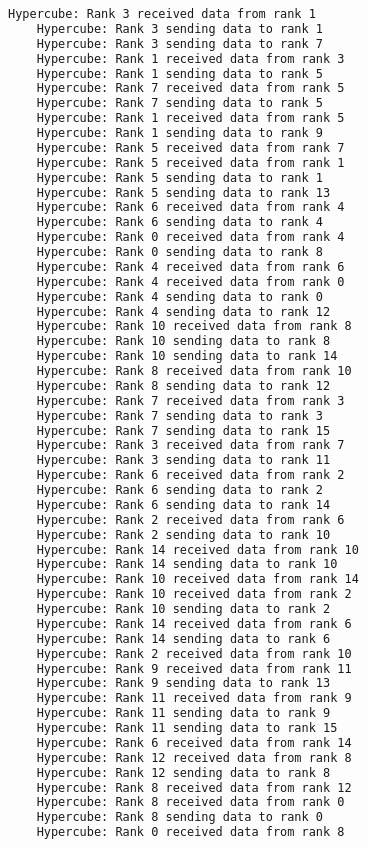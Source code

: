 \documentclass[11pt]{article}
\begin{document}
\begin{lstlisting}[language=bash,caption=Baobab Output]
    Hypercube: Rank 3 received data from rank 1
    Hypercube: Rank 3 sending data to rank 1
    Hypercube: Rank 3 sending data to rank 7
    Hypercube: Rank 1 received data from rank 3
    Hypercube: Rank 1 sending data to rank 5
    Hypercube: Rank 7 received data from rank 5
    Hypercube: Rank 7 sending data to rank 5
    Hypercube: Rank 1 received data from rank 5
    Hypercube: Rank 1 sending data to rank 9
    Hypercube: Rank 5 received data from rank 7
    Hypercube: Rank 5 received data from rank 1
    Hypercube: Rank 5 sending data to rank 1
    Hypercube: Rank 5 sending data to rank 13
    Hypercube: Rank 6 received data from rank 4
    Hypercube: Rank 6 sending data to rank 4
    Hypercube: Rank 0 received data from rank 4
    Hypercube: Rank 0 sending data to rank 8
    Hypercube: Rank 4 received data from rank 6
    Hypercube: Rank 4 received data from rank 0
    Hypercube: Rank 4 sending data to rank 0
    Hypercube: Rank 4 sending data to rank 12
    Hypercube: Rank 10 received data from rank 8
    Hypercube: Rank 10 sending data to rank 8
    Hypercube: Rank 10 sending data to rank 14
    Hypercube: Rank 8 received data from rank 10
    Hypercube: Rank 8 sending data to rank 12
    Hypercube: Rank 7 received data from rank 3
    Hypercube: Rank 7 sending data to rank 3
    Hypercube: Rank 7 sending data to rank 15
    Hypercube: Rank 3 received data from rank 7
    Hypercube: Rank 3 sending data to rank 11
    Hypercube: Rank 6 received data from rank 2
    Hypercube: Rank 6 sending data to rank 2
    Hypercube: Rank 6 sending data to rank 14
    Hypercube: Rank 2 received data from rank 6
    Hypercube: Rank 2 sending data to rank 10
    Hypercube: Rank 14 received data from rank 10
    Hypercube: Rank 14 sending data to rank 10
    Hypercube: Rank 10 received data from rank 14
    Hypercube: Rank 10 received data from rank 2
    Hypercube: Rank 10 sending data to rank 2
    Hypercube: Rank 14 received data from rank 6
    Hypercube: Rank 14 sending data to rank 6
    Hypercube: Rank 2 received data from rank 10
    Hypercube: Rank 9 received data from rank 11
    Hypercube: Rank 9 sending data to rank 13
    Hypercube: Rank 11 received data from rank 9
    Hypercube: Rank 11 sending data to rank 9
    Hypercube: Rank 11 sending data to rank 15
    Hypercube: Rank 6 received data from rank 14
    Hypercube: Rank 12 received data from rank 8
    Hypercube: Rank 12 sending data to rank 8
    Hypercube: Rank 8 received data from rank 12
    Hypercube: Rank 8 received data from rank 0
    Hypercube: Rank 8 sending data to rank 0
    Hypercube: Rank 0 received data from rank 8

\end{lstlisting}
\end{document}
